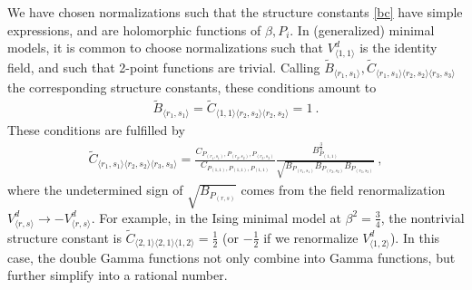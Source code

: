 \documentclass[12pt, a4paper]{article}
\begin{document}
We have chosen normalizations such that the structure constants \eqref{bc} have simple expressions, and are holomorphic functions of $\beta,P_i$. In (generalized) minimal models, it is common to choose normalizations such that $V^d_{\langle 1,1\rangle}$ is the identity field, and such that 2-point functions are trivial. Calling $\widetilde{B}_{\langle r_1,s_1\rangle},\widetilde{C}_{\langle r_1,s_1\rangle\langle r_2,s_2\rangle \langle r_3,s_3\rangle}$ the corresponding structure constants, these conditions amount to 
\begin{align}
 \widetilde{B}_{\langle r_1,s_1\rangle} = \widetilde{C}_{\langle 1,1\rangle\langle r_2,s_2\rangle \langle r_2,s_2\rangle} = 1\ .
\end{align}
These conditions are fulfilled by 
\begin{align}
 \widetilde{C}_{\langle r_1,s_1\rangle\langle r_2,s_2\rangle \langle r_3,s_3\rangle} 
 = \frac{C_{P_{(r_1,s_1)},P_{(r_2,s_2)},P_{(r_3,s_3)}}}{C_{P_{(1,1)},P_{(1,1)},P_{(1,1)}}}
 \frac{B_{P_{(1,1)}}^\frac32}
 {\sqrt{B_{P_{(r_1,s_1)}}B_{P_{(r_2,s_2)}} B_{P_{(r_3,s_3)}}}}\ ,
 \label{wtc}
\end{align}
where the undetermined sign of $\sqrt{B_{P_{(r,s)}}}$ comes from the field renormalization $V^d_{\langle r,s\rangle}\to - V^d_{\langle r,s\rangle}$.
For example, in the Ising minimal model at $\beta^2=\frac34$, the nontrivial structure constant is $\widetilde{C}_{\langle 2,1\rangle\langle 2,1\rangle\langle 1,2\rangle}=\frac12$ (or $-\frac12$ if we renormalize $V^d_{\langle 1,2\rangle}$). In this case, the double Gamma functions not only combine into Gamma functions, but further simplify into a rational number.
\end{document}

